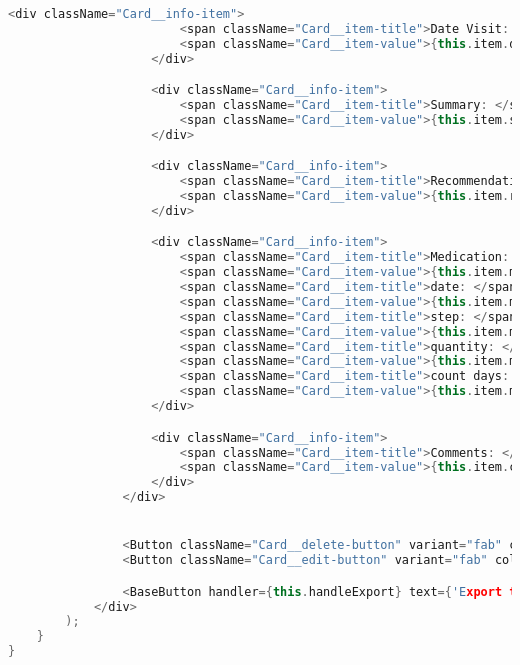 \begin{lstlisting}[language=C++, style=cplusplusstyle]
                    <div className="Card__info-item">
                        <span className="Card__item-title">Date Visit: </span>
                        <span className="Card__item-value">{this.item.dateOfVisit}</span>
                    </div>

                    <div className="Card__info-item">
                        <span className="Card__item-title">Summary: </span>
                        <span className="Card__item-value">{this.item.summary}</span>
                    </div>

                    <div className="Card__info-item">
                        <span className="Card__item-title">Recommendations: </span>
                        <span className="Card__item-value">{this.item.recomendations}</span>
                    </div>

                    <div className="Card__info-item">
                        <span className="Card__item-title">Medication: </span>
                        <span className="Card__item-value">{this.item.medications.nameOfMedication},</span>
                        <span className="Card__item-title">date: </span>
                        <span className="Card__item-value">{this.item.medications.dateStarted};</span>
                        <span className="Card__item-title">step: </span>
                        <span className="Card__item-value">{this.item.medications.stepTreatment},</span>
                        <span className="Card__item-title">quantity: </span>
                        <span className="Card__item-value">{this.item.medications.quantity},</span>
                        <span className="Card__item-title">count days: </span>
                        <span className="Card__item-value">{this.item.medications.countDays}.</span>
                    </div>

                    <div className="Card__info-item">
                        <span className="Card__item-title">Comments: </span>
                        <span className="Card__item-value">{this.item.comments}</span>
                    </div>
                </div>


                <Button className="Card__delete-button" variant="fab" color="accent" onClick={this.onTapDeleteHandler}>D</Button>
                <Button className="Card__edit-button" variant="fab" color="primary" onClick={this.onTapEditHandler}>E</Button>

                <BaseButton handler={this.handleExport} text={'Export to file'}/>
            </div>
        );
    }
}


\end{lstlisting}
